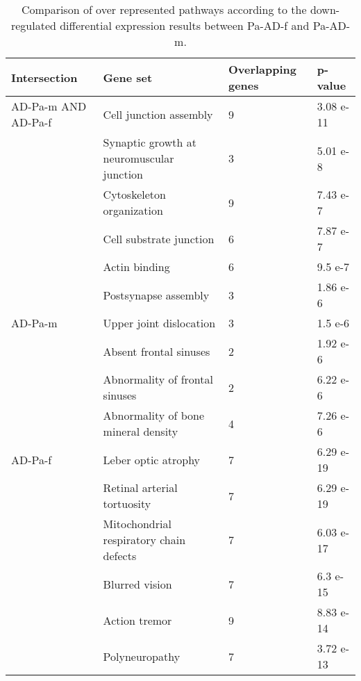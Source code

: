 \begin{table}[!ht]
\centering
\caption{Comparison of over represented pathways according to the down-regulated differential expression results between Pa-AD-f and Pa-AD-m.}
\begin{tabularx}{11cm}{L{2cm}L{2.5cm}L{3cm}C{1.5cm}}
\toprule
\textbf{Intersection} & \textbf{Gene set} & \textbf{Overlapping genes} & \textbf{p-value} \\
\midrule
AD-Pa-m AND AD-Pa-f & Cell junction assembly                    & 9 & 3.08 e-11 \\
                    & Synaptic growth at neuromuscular junction & 3 & 5.01 e-8  \\
                    & Cytoskeleton organization                 & 9 & 7.43 e-7  \\
                    & Cell substrate junction                   & 6 & 7.87 e-7  \\
                    & Actin binding                             & 6 & 9.5 e-7   \\
                    & Postsynapse assembly                      & 3 & 1.86 e-6  \\
AD-Pa-m             & Upper joint dislocation                   & 3 & 1.5 e-6   \\
                    & Absent frontal sinuses                    & 2 & 1.92 e-6  \\
                    & Abnormality of frontal sinuses            & 2 & 6.22 e-6  \\
                    & Abnormality of bone mineral density       & 4 & 7.26 e-6  \\
AD-Pa-f             & Leber optic atrophy                       & 7 & 6.29 e-19 \\
                    & Retinal arterial tortuosity               & 7 & 6.29 e-19 \\
                    & Mitochondrial respiratory chain defects   & 7 & 6.03 e-17 \\
                    & Blurred vision                            & 7 & 6.3 e-15  \\
                    & Action tremor                             & 9 & 8.83 e-14 \\
                    & Polyneuropathy                            & 7 & 3.72 e-13 \\
\bottomrule

\end{tabularx}
\end{table}


